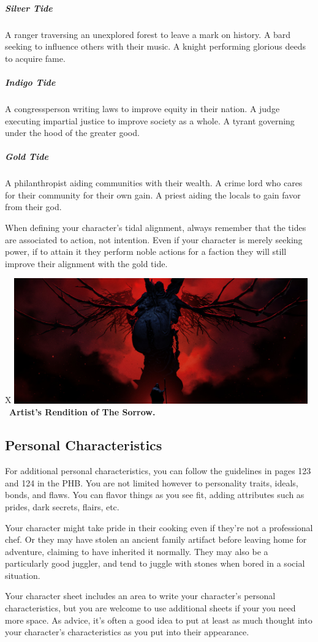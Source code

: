     \subparagraph{Silver Tide} A ranger traversing an unexplored forest to leave a mark on history.
        A bard seeking to influence others with their music.
        A knight performing glorious deeds to acquire fame.

    \subparagraph{Indigo Tide} A congressperson writing laws to improve equity in their nation.
        A judge executing impartial justice to improve society as a whole.
        A tyrant governing under the hood of the greater good.

    \subparagraph{Gold Tide} A philanthropist aiding communities with their wealth.
        A crime lord who cares for their community for their own gain.
        A priest aiding the locals to gain favor from their god.

    When defining your character's tidal alignment, always remember that the tides are associated to action, not intention.
    Even if your character is merely seeking power, if to attain it they perform noble actions for a faction they will still improve their alignment with the gold tide.

\begin{table}[b]%
    \begin{DndTable}[width=\linewidth]{X}
        \centering
        \includegraphics[width=0.95\textwidth]{05background/img/tidal_sway_rendition.png} \
        \centering \large{\textbf{Artist's Rendition of The Sorrow.}}
    \end{DndTable}
\end{table}

\subsection*{Personal Characteristics}
    For additional personal characteristics, you can follow the guidelines in pages 123 and 124 in the PHB.
    You are not limited however to personality traits, ideals, bonds, and flaws.
    You can flavor things as you see fit, adding attributes such as prides, dark secrets, flairs, etc.

    Your character might take pride in their cooking even if they're not a professional chef.
    Or they may have stolen an ancient family artifact before leaving home for adventure, claiming to have inherited it normally.
    They may also be a particularly good juggler, and tend to juggle with stones when bored in a social situation.

    Your character sheet includes an area to write your character's personal characteristics, but you are welcome to use additional sheets if your you need more space.
    As advice, it's often a good idea to put at least as much thought into your character's characteristics as you put into their appearance.
